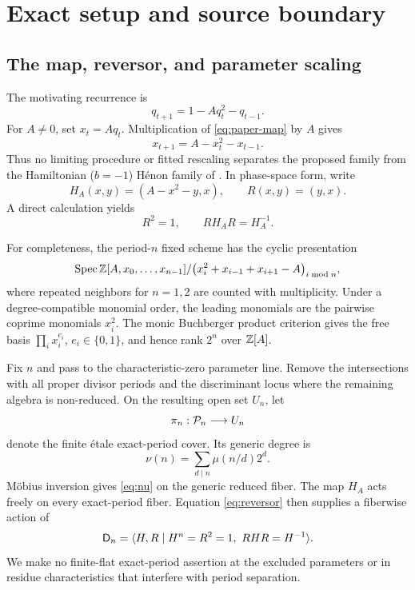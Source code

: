 \section{Exact setup and source boundary}\label{sec:setup}

\subsection{The map, reversor, and parameter scaling}

The motivating recurrence is
\begin{equation}\label{eq:paper-map}
q_{t+1}=1-Aq_t^2-q_{t-1}.
\end{equation}
For $A\ne0$, set $x_t=Aq_t$.  Multiplication of
\eqref{eq:paper-map} by $A$ gives
\begin{equation}\label{eq:ham-henon}
x_{t+1}=A-x_t^2-x_{t-1}.
\end{equation}
Thus no limiting procedure or fitted rescaling separates the proposed family
from the Hamiltonian ($b=-1$) H\'enon family of
\citet{endler2002,endler2004,endler2006chiral}.  In phase-space form, write
\begin{equation}
H_A(x,y)=(A-x^2-y,x),\qquad R(x,y)=(y,x).
\end{equation}
A direct calculation yields
\begin{equation}\label{eq:reversor}
R^2=1,\qquad RH_AR=H_A^{-1}.
\end{equation}

For completeness, the period-$n$ fixed scheme has the cyclic presentation
\begin{equation}
\operatorname{Spec}\mathbb Z[A,x_0,\ldots,x_{n-1}]/
\bigl(x_i^2+x_{i-1}+x_{i+1}-A\bigr)_{i\bmod n},
\end{equation}
where repeated neighbors for $n=1,2$ are counted with multiplicity.  Under a
degree-compatible monomial order, the leading monomials are the pairwise
coprime monomials $x_i^2$.  The monic Buchberger product criterion gives the
free basis $\prod_i x_i^{e_i}$, $e_i\in\{0,1\}$, and hence rank $2^n$ over
$\mathbb Z[A]$.

Fix $n$ and pass to the characteristic-zero parameter line.  Remove the
intersections with all proper divisor periods and the discriminant locus where
the remaining algebra is non-reduced.  On the resulting open set $U_n$, let
\begin{equation}
\pi_n:\mathcal P_n\longrightarrow U_n
\end{equation}
denote the finite \'{e}tale exact-period cover.  Its generic degree is
\begin{equation}\label{eq:nu}
\nu(n)=\sum_{d\mid n}\mu(n/d)2^d.
\end{equation}
M\"obius inversion gives \eqref{eq:nu} on the generic reduced fiber.  The map
$H_A$ acts freely on every exact-period fiber.  Equation
\eqref{eq:reversor} then supplies a fiberwise action of
\begin{equation}
\Dih=\langle H,R\mid H^n=R^2=1,\ RHR=H^{-1}\rangle.
\end{equation}
We make no finite-flat exact-period assertion at the excluded parameters or in
residue characteristics that interfere with period separation.

